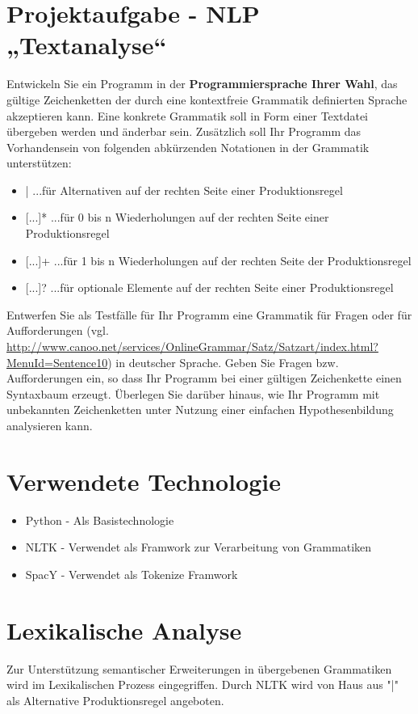 \documentclass[12pt]{scrartcl}
\begin{document}
	\tableofcontents
	\newpage
	
	\section{Projektaufgabe - NLP „Textanalyse“}
	Entwickeln Sie ein Programm in der \textbf{Programmiersprache Ihrer Wahl}, das gültige Zeichenketten der durch eine kontextfreie Grammatik definierten Sprache akzeptieren kann. Eine konkrete Grammatik soll in Form einer Textdatei übergeben werden und änderbar sein. Zusätzlich soll Ihr Programm das Vorhandensein von folgenden abkürzenden Notationen in der Grammatik unterstützen:
	\begin{itemize}
		\item { | ...für Alternativen auf der rechten Seite einer Produktionsregel}
		\item {[...]* ...für 0 bis n Wiederholungen auf der rechten Seite einer Produktionsregel}
		\item {[...]+ ...für 1 bis n Wiederholungen auf der rechten Seite der Produktionsregel}
		\item {[...]? ...für optionale Elemente auf der rechten Seite einer Produktionsregel}
	\end{itemize}
	Entwerfen Sie als Testfälle für Ihr Programm eine Grammatik für Fragen oder für Aufforderungen (vgl. \url{http://www.canoo.net/services/OnlineGrammar/Satz/Satzart/index.html?MenuId=Sentence10}) in deutscher Sprache. Geben Sie Fragen bzw. Aufforderungen ein, so dass Ihr Programm bei einer gültigen Zeichenkette einen Syntaxbaum erzeugt. Überlegen Sie darüber hinaus, wie Ihr Programm mit unbekannten Zeichenketten unter Nutzung einer einfachen Hypothesenbildung analysieren kann.
	\newpage
	
	\section{Verwendete Technologie}
	\begin{itemize}
		\item {Python - Als Basistechnologie}
		\item {NLTK - Verwendet als Framwork zur Verarbeitung von Grammatiken}
		\item {SpacY - Verwendet als Tokenize Framwork}
	\end{itemize}
	
	\section{Lexikalische Analyse}
	Zur Unterstützung semantischer Erweiterungen in übergebenen Grammatiken wird im Lexikalischen Prozess eingegriffen. Durch NLTK wird von Haus aus "|" als Alternative Produktionsregel angeboten. 
\end{document}
